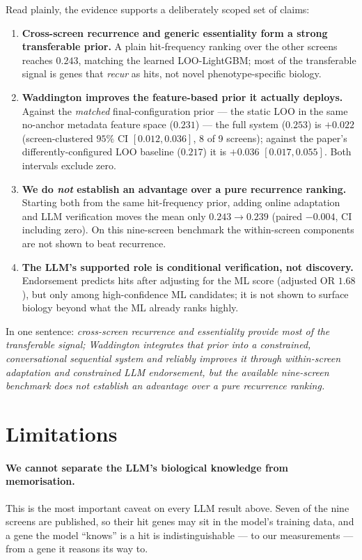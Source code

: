 \documentclass[11pt]{article}
\begin{document}
Read plainly, the evidence supports a deliberately scoped set of claims:
\begin{enumerate}\itemsep2pt
  \item \textbf{Cross-screen recurrence and generic essentiality form a strong transferable prior.} A
  plain hit-frequency ranking over the other screens reaches $0.243$, matching the learned LOO-LightGBM;
  most of the transferable signal is genes that \emph{recur} as hits, not novel phenotype-specific biology.
  \item \textbf{Waddington improves the feature-based prior it actually deploys.} Against the
  \emph{matched} final-configuration prior --- the static LOO in the same no-anchor metadata feature space
  ($0.231$) --- the full system ($0.253$) is $+0.022$ (screen-clustered $95\%$ CI $[0.012,0.036]$, 8 of 9
  screens); against the paper's differently-configured LOO baseline ($0.217$) it is $+0.036$
  $[0.017,0.055]$. Both intervals exclude zero.
  \item \textbf{We do \emph{not} establish an advantage over a pure recurrence ranking.} Starting both from
  the same hit-frequency prior, adding online adaptation and LLM verification moves the mean only
  $0.243\!\rightarrow\!0.239$ (paired $-0.004$, CI including zero). On this nine-screen benchmark the
  within-screen components are not shown to beat recurrence.
  \item \textbf{The LLM's supported role is conditional verification, not discovery.} Endorsement predicts
  hits after adjusting for the ML score (adjusted OR $1.68$), but only among high-confidence ML candidates;
  it is not shown to surface biology beyond what the ML already ranks highly.
\end{enumerate}

\noindent
In one sentence: \emph{cross-screen recurrence and essentiality provide most of the transferable signal;
Waddington integrates that prior into a constrained, conversational sequential system and reliably improves
it through within-screen adaptation and constrained LLM endorsement, but the available nine-screen
benchmark does not establish an advantage over a pure recurrence ranking.}

\section*{Limitations}

\paragraph{We cannot separate the LLM's biological knowledge from memorisation.}
This is the most important caveat on every LLM result above. Seven of the nine screens are published,
so their hit genes may sit in the model's training data, and a gene the model ``knows'' is a hit is
indistinguishable --- to our measurements --- from a gene it reasons its way to.
\end{document}
